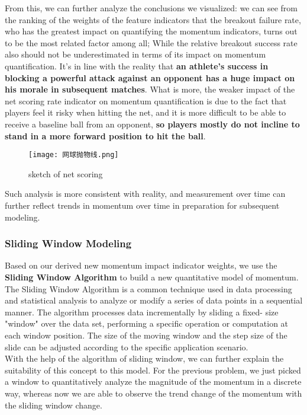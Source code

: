 \documentclass{mcmthesis}
\begin{document}
From this, we can further analyze the conclusions we visualized: we can see from the ranking
of the weights of the feature indicators that the breakout failure rate, who has the greatest impact
on quantifying the momentum indicators, turns out to be the most related factor among all; While
the relative breakout success rate also should not be underestimated in terms of its impact on
momentum quantification. It's in line with the reality that {\bf an athlete's success in blocking a
powerful attack against an opponent has a huge impact on his morale in subsequent matches}. What is more, the weaker impact of the net scoring rate indicator on momentum
quantification is due to the fact that players feel it risky when hitting the net, and it is more
difficult to be able to receive a baseline ball from an opponent, {\bf so players mostly do not incline
to stand in a more forward position to hit the ball}.

\begin{figure}[htbp]
    \centering
    \texttt{[image: 网球抛物线.png]}
    \caption{sketch of net scoring} \label{Figure 17}
\end{figure}

Such analysis is more consistent with reality, and measurement over time can further reflect trends in momentum over time in preparation for subsequent modeling.

\subsubsection{Sliding Window Modeling}
Based on our derived new momentum impact indicator weights, we use the {\bf Sliding Window
Algorithm} to build a new quantitative model of momentum. The Sliding Window Algorithm is a
common technique used in data processing and statistical analysis to analyze or modify a series of
data points in a sequential manner. The algorithm processes data incrementally by sliding a fixed- size "window" over the data set, performing a specific operation or computation at each window
position. The size of the moving window and the step size of the slide can be adjusted according
to the specific application scenario. \\
With the help of the algorithm of sliding window, we can further explain the suitability of this
concept to this model. For the previous problem, we just picked a window to quantitatively
analyze the magnitude of the momentum in a discrete way, whereas now we are able to observe
the trend change of the momentum with the sliding window change.
\end{document}
